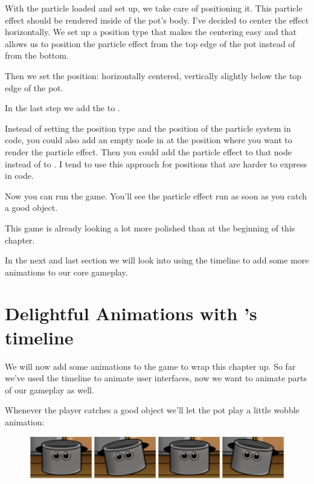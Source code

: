 With the particle loaded and set up, we take care of positioning it. This
particle effect should be rendered inside of the pot's body. I've decided to
center the effect horizontally. We set up a position type that makes the
centering easy and that allows us to position the particle effect from the top
edge of the pot instead of from the bottom.

Then we set the position: horizontally centered, vertically slightly below the
top edge of the pot.

In the last step we add the  to .

\begin{details}
Instead of setting the position type and the position of the particle system in
code, you could also add an empty node in \SB{} at the position where you want
to render the particle effect. Then you could add the particle effect to that
node instead of to . I tend to use this approach for
positions that are harder to express in code.
\end{details}

Now you can run the game. You'll see the particle effect run as soon as you
catch a good object. 

This game is already looking a lot more polished than at the beginning of this
chapter.

In the next and last section we will look into using the \SB{} timeline to add
some more animations to our core gameplay.

\section{Delightful Animations with \SB{}'s timeline}
We will now add some animations to the game to wrap this chapter up. So far
we've used the \SB{} timeline to animate user interfaces, now we want to
animate parts of our gameplay as well.

Whenever the player catches a good object we'll let the pot play a little wobble
animation:

\begin{figure}[H]
  \centering
  \includegraphics[width=0.8\linewidth]{images/Chapter9/wobble_animation.png}
\end{figure}

